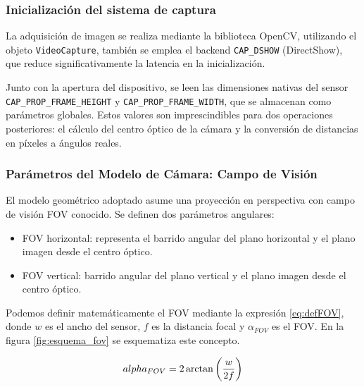 \subsubsection{Inicialización del sistema de captura}

La adquisición de imagen se realiza mediante la biblioteca OpenCV, utilizando el objeto \texttt{VideoCapture}, también se emplea el backend \texttt{CAP\_DSHOW} (DirectShow), que reduce significativamente la latencia en la inicialización.

Junto con la apertura del dispositivo, se leen las dimensiones nativas del sensor \\\texttt{CAP\_PROP\_FRAME\_HEIGHT} y \texttt{CAP\_PROP\_FRAME\_WIDTH}, que se almacenan como parámetros globales. Estos valores son imprescindibles para dos operaciones posteriores: el cálculo del centro óptico de la cámara y la conversión de distancias en píxeles a ángulos reales.

\subsubsection{Parámetros del Modelo de Cámara: Campo de Visión}
El modelo geométrico adoptado asume una proyección en perspectiva con campo de visión \gls{FOV} conocido. Se definen dos parámetros angulares:
\begin{itemize}
    \item \gls{FOV} horizontal: representa el barrido angular del plano horizontal y el plano imagen desde el centro óptico.
    \item \gls{FOV} vertical: barrido angular del plano vertical y el plano imagen desde el centro óptico.
\end{itemize}

Podemos definir matemáticamente el \gls{FOV} mediante la expresión \eqref{eq:defFOV}, donde $w$ es el ancho del sensor, $f$ es la distancia focal y $\alpha_{FOV}$ es el \gls{FOV}. En la figura \ref{fig:esquema_fov} se esquematiza este concepto.

\begin{equation} 
\\alpha_{FOV} = 2\arctan\left(\frac{w}{2f}\right)
\label{eq:defFOV}
\end{equation}

